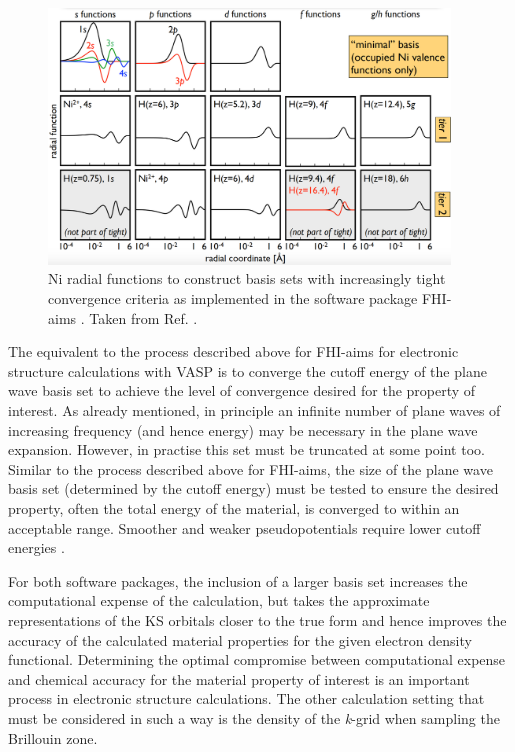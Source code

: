 \documentclass[11pt, twoside]{report}
\begin{document}
\begin{figure}[h!]
  \centering
    \includegraphics[width=0.95\textwidth]{figures/FHI-aims_tiers.png}
    \caption{Ni radial functions to construct basis sets with increasingly tight convergence criteria as implemented in the software package FHI-aims \cite{FHI-aims}. Taken from Ref. .}
  \label{FHI-aims_tiers}
\end{figure}

The equivalent to the process described above for FHI-aims for electronic structure calculations with VASP is to converge the cutoff energy of the plane wave basis set to achieve the level of convergence desired for the property of interest. As already mentioned, in principle an infinite number of plane waves of increasing frequency (and hence energy) may be necessary in the plane wave expansion. However, in practise this set must be truncated at some point too. Similar to the process described above for FHI-aims, the size of the plane wave basis set (determined by the cutoff energy) must be tested to ensure the desired property, often the total energy of the material, is converged to within an acceptable range. Smoother and weaker pseudopotentials require lower cutoff energies \cite{Prasad_ch6}.

For both software packages, the inclusion of a larger basis set increases the computational expense of the calculation, but takes the approximate representations of the KS orbitals closer to the true form and hence improves the accuracy of the calculated material properties for the given electron density functional. Determining the optimal compromise between computational expense and chemical accuracy for the material property of interest is an important process in electronic structure calculations. The other calculation setting that must be considered in such a way is the density of the \textit{k}-grid when sampling the Brillouin zone.
\end{document}
